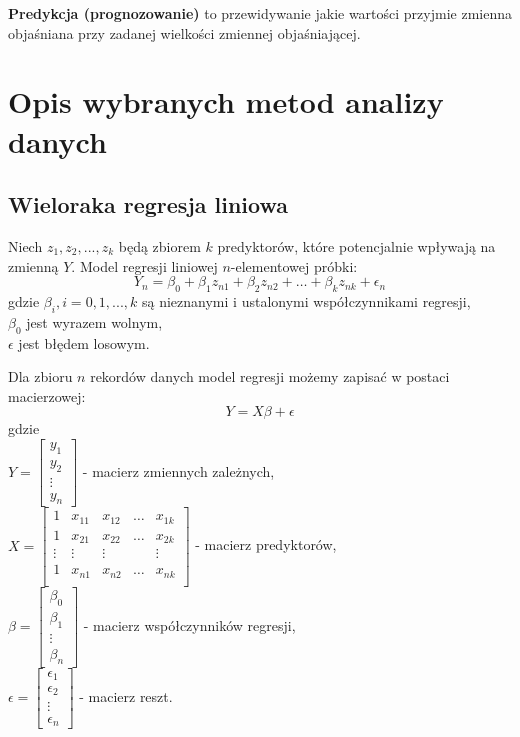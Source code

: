 \textbf{Predykcja (prognozowanie)} to przewidywanie jakie wartości przyjmie zmienna objaśniana przy zadanej wielkości zmiennej objaśniającej.\cite{bptstatystyka}
\section{Opis wybranych metod analizy danych}\label{metody_analizy_danych}
\subsection{Wieloraka regresja liniowa} \label{regresja}
Niech \(z_1, z_2, ..., z_k\) będą zbiorem \(k\) predyktorów, które potencjalnie wpływają na zmienną \(Y\). Model regresji liniowej \(n\)-elementowej próbki:
\[Y_n = \beta_0 + \beta_1z_{n1} + \beta_2z_{n2} + \dots + \beta_kz_{nk} + \epsilon_n\]
gdzie \(\beta_i, i = 0, 1, ..., k\) są nieznanymi i ustalonymi współczynnikami regresji,\\
\(\beta_0\) jest wyrazem wolnym,\\
\(\epsilon\) jest błędem losowym.\cite{wielowymiarowymodelregresjiliniowej2014}

Dla zbioru \(n\) rekordów danych model regresji możemy zapisać w postaci macierzowej: \[Y = X\beta + \epsilon\]
gdzie\\
\(Y = \begin{bmatrix}
y_1 \\
y_2 \\
\vdots \\
y_n
\end{bmatrix}\) - macierz zmiennych zależnych,\\
\(X = \begin{bmatrix}
1 & x_{11} & x_{12} & \dots & x_{1k} \\
1 & x_{21} & x_{22} & \dots & x_{2k} \\
\vdots & \vdots & \vdots & & \vdots \\
1 & x_{n1} & x_{n2} & \dots & x_{nk} \\
\end{bmatrix}\) - macierz predyktorów,\\
\(\beta = \begin{bmatrix}
\beta_0 \\
\beta_1 \\
\vdots \\
\beta_n
\end{bmatrix}\) - macierz współczynników regresji,\\
\(\epsilon = \begin{bmatrix}
\epsilon_1 \\
\epsilon_2 \\
\vdots \\
\epsilon_n
\end{bmatrix} \) - macierz reszt. \cite{martinabremer2012}
